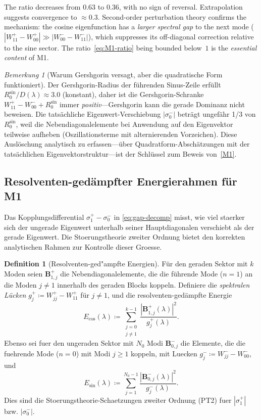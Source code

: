 \documentclass[12pt,a4paper]{article}
\theoremstyle{definition}
\newtheorem{definition}[theorem]{Definition}
\theoremstyle{remark}
\newtheorem{remark}[theorem]{Bemerkung}
\begin{document}
\noindent The ratio decreases from $0.63$ to $0.36$, with no sign of reversal. Extrapolation suggests convergence to $\approx 0.3$. Second-order perturbation theory confirms the mechanism: the cosine eigenfunction has a \emph{larger spectral gap} to the next mode ($|W_{11}^+ - W_{00}^+| \gg |W_{00}^- - W_{11}^-|$), which suppresses its off-diagonal correction relative to the sine sector. The ratio~\eqref{eq:M1-ratio} being bounded below~$1$ is the \emph{essential content} of M1.

\begin{remark}[Warum Gershgorin versagt, aber die quadratische Form funktioniert]
Der Gershgorin-Radius der führenden Sinus-Zeile erfüllt $R_0^{\sin}/D(\lambda) \approx 3.0$ (konstant), daher ist die Gershgorin-Schranke $W_{11}^+ - W_{00}^- + R_0^{\sin}$ immer \emph{positiv}---Gershgorin kann die gerade Dominanz nicht beweisen. Die tatsächliche Eigenwert-Verschiebung $|\sigma_0^-|$ beträgt ungefähr 1/3 von $R_0^{\sin}$, weil die Nebendiagonalelemente bei Anwendung auf den Eigenvektor teilweise aufheben (Oszillationsterme mit alternierenden Vorzeichen). Diese Auslöschung analytisch zu erfassen---über Quadratform-Abschätzungen mit der tatsächlichen Eigenvektorstruktur---ist der Schlüssel zum Beweis von~\ref{M1}.
\end{remark}


\subsection{Resolventen-ged\"ampfter Energierahmen f\"ur M1}
\label{sec:resolvent-M1}

Das Kopplungsdifferential $\sigma_1^+ - \sigma_0^-$ in \eqref{eq:gap-decomp} misst, wie viel staerker sich der ungerade Eigenwert unterhalb seiner Hauptdiagonalen verschiebt als der gerade Eigenwert. Die Stoerungstheorie zweiter Ordnung bietet den korrekten analytischen Rahmen zur Kontrolle dieser Groesse.

\begin{definition}[Resolventen-ged"ampfte Energien]
\label{def:resolvent-energies}
Für den geraden Sektor mit $k$ Moden seien $\mathbf{B}^+_{1,j}$ die Nebendiagonalelemente, die die führende Mode ($n=1$) an die Moden $j \neq 1$ innerhalb des geraden Blocks koppeln. Definiere die \emph{spektralen Lücken} $g_j^+ \coloneqq W_{jj}^+ - W_{11}^+$ für $j \neq 1$, und die resolventen-gedämpfte Energie
\[
  E_{\cos}(\lambda) \coloneqq \sum_{\substack{j=0 \\ j \neq 1}}^{k-1} \frac{|\mathbf{B}^+_{1,j}(\lambda)|^2}{g_j^+(\lambda)}.
\]
Ebenso sei fuer den ungeraden Sektor mit $N_0$ Modi $\mathbf{B}^-_{0,j}$ die Elemente, die die fuehrende Mode ($n=0$) mit Modi $j \geq 1$ koppeln, mit Luecken $g_j^- \coloneqq W_{jj}^- - W_{00}^-$, und
\[
  E_{\sin}(\lambda) \coloneqq \sum_{j=1}^{N_0-1} \frac{|\mathbf{B}^-_{0,j}(\lambda)|^2}{g_j^-(\lambda)}.
\]
Dies sind die Stoerungstheorie-Schaetzungen zweiter Ordnung (PT2) fuer $|\sigma_1^+|$ bzw. $|\sigma_0^-|$.
\end{definition}
\end{document}
